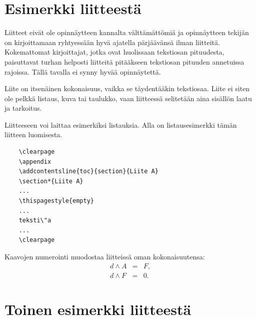 \documentclass[english,12pt,a4paper,pdftex,sci,utf8]{aaltothesis}
\begin{document}
\clearpage

\thesisappendix

\section{Esimerkki liitteest\"a\label{LiiteA}}

Liitteet eiv\"at ole opinn\"aytteen kannalta v\"altt\"am\"att\"omi\"a ja 
opinn\"aytteen tekij\"an on 
kirjoittamaan ryhtyess\"a\"an hyv\"a ajatella p\"arj\"a\"av\"ans\"a ilman liitteit\"a.
Kokemattomat kirjoittajat, jotka ovat huolissaan
tekstiosan pituudesta, paisuttavat turhan 
helposti liitteit\"a pit\"a\"akseen tekstiosan pituuden annetuissa rajoissa.
T\"all\"a tavalla ei synny hyv\"a\"a opinn\"aytett\"a.   

Liite on itsen\"ainen kokonaisuus, vaikka se t\"aydent\"a\"akin tekstiosaa.
Liite ei siten ole pelkk\"a listaus, kuva tai taulukko, vaan 
liitteess\"a selitet\"a\"an aina sis\"all\"on laatu ja tarkoitus. 

Liitteeseen voi laittaa esimerkiksi listauksia. Alla on 
listausesimerkki t\"am\"an liitteen luomisesta. 

\begin{verbatim}
	\clearpage
	\appendix
	\addcontentsline{toc}{section}{Liite A}
	\section*{Liite A}
	...
	\thispagestyle{empty}
	...
	teksti\"a
	...
	\clearpage
\end{verbatim}

Kaavojen numerointi muodostaa liitteiss\"a oman kokonaisuutensa:
\begin{eqnarray}
d \wedge A  &=& F, \label{liitekaava1}\\
d \wedge F  &=& 0. \label{liitekaava2}
\end{eqnarray}


\clearpage
\section{Toinen esimerkki liitteest\"a\label{LiiteB}}

\end{document}
